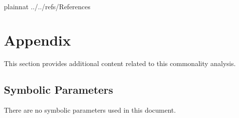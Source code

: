 \documentclass[12pt]{article}
\begin{document}
\newpage

 {plainnat}
 {../../refs/References}

\newpage

\section{Appendix}

	This section provides additional content related to this commonality 
	analysis.

\subsection{Symbolic Parameters}

There are no symbolic parameters used in this document.
\end{document}
